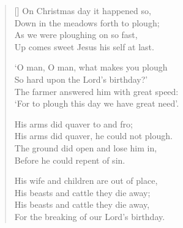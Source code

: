 \documentclass[12pt]{article}
\begin{document}
\begin{verse}[\versewidth]
On Christmas day it happened so,\\
Down in the meadows forth to plough;\\
As we were ploughing on so fast,\\
Up comes sweet Jesus his self at last.

`O man, O man, what makes you plough\\
So hard upon the Lord's birthday?'\\
The farmer answered him with great speed:\\
`For to plough this day we have great need'.

His arms did quaver to and fro;\\
His arms did quaver, he could not plough.\\
The ground did open and lose him in,\\
Before he could repent of sin.

His wife and children are out of place,\\
His beasts and cattle they die away;\\
His beasts and cattle they die away,\\
For the breaking of our Lord's birthday.
\end{verse}
\end{document}
